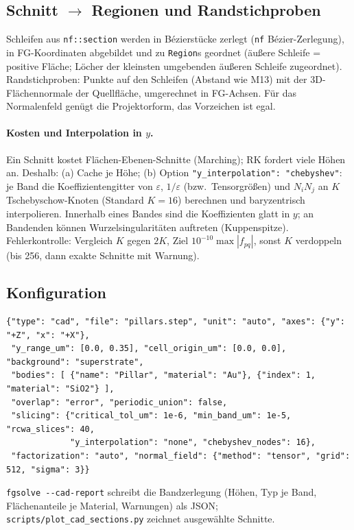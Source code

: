\subsection{Schnitt $\to$ Regionen und Randstichproben}
Schleifen aus \verb|nf::section| werden in Bézierstücke zerlegt (\verb|nf| Bézier-Zerlegung), in FG-Koordinaten
abgebildet und zu \verb|Region|s geordnet (äußere Schleife = positive Fläche; Löcher der kleinsten umgebenden
äußeren Schleife zugeordnet). Randstichproben: Punkte auf den Schleifen (Abstand wie M13) mit der 3D-Flächennormale
der Quellfläche, umgerechnet in FG-Achsen. Für das Normalenfeld genügt die Projektorform, das Vorzeichen ist egal.

\paragraph{Kosten und Interpolation in $y$.} Ein Schnitt kostet Flächen-Ebenen-Schnitte (Marching); RK fordert viele
Höhen an. Deshalb: (a) Cache je Höhe; (b) Option \verb|"y_interpolation": "chebyshev"|: je Band die
Koeffizientengitter von $\varepsilon$, $1/\varepsilon$ (bzw.\ Tensorgrößen) und $N_iN_j$ an $K$ Tschebyschow-Knoten
(Standard $K=16$) berechnen und baryzentrisch interpolieren. Innerhalb eines Bandes sind die Koeffizienten glatt in
$y$; an Bandenden können Wurzelsingularitäten auftreten (Kuppenspitze). Fehlerkontrolle: Vergleich $K$ gegen $2K$,
Ziel $10^{-10}\max|f_{pq}|$, sonst $K$ verdoppeln (bis 256, dann exakte Schnitte mit Warnung).

\subsection{Konfiguration}
{\footnotesize\begin{verbatim}
{"type": "cad", "file": "pillars.step", "unit": "auto", "axes": {"y": "+Z", "x": "+X"},
 "y_range_um": [0.0, 0.35], "cell_origin_um": [0.0, 0.0], "background": "superstrate",
 "bodies": [ {"name": "Pillar", "material": "Au"}, {"index": 1, "material": "SiO2"} ],
 "overlap": "error", "periodic_union": false,
 "slicing": {"critical_tol_um": 1e-6, "min_band_um": 1e-5, "rcwa_slices": 40,
             "y_interpolation": "none", "chebyshev_nodes": 16},
 "factorization": "auto", "normal_field": {"method": "tensor", "grid": 512, "sigma": 3}}
\end{verbatim}}
\verb|fgsolve --cad-report| schreibt die Bandzerlegung (Höhen, Typ je Band, Flächenanteile je Material, Warnungen)
als JSON; \verb|scripts/plot_cad_sections.py| zeichnet ausgewählte Schnitte.

